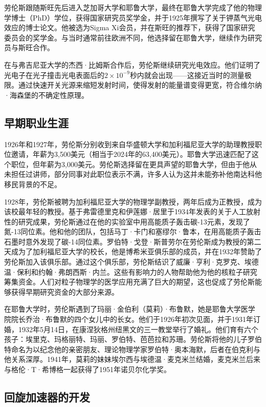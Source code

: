 劳伦斯跟随斯旺先后进入芝加哥大学和耶鲁大学，最终在耶鲁大学完成了他的物理学博士（PhD）学位，获得国家研究员奖学金，并于1925年撰写了关于钾蒸气光电效应的博士论文。他被选为Sigma Xi会员，并在斯旺的推荐下，获得了国家研究委员会的奖学金。与当时通常前往欧洲不同，他选择留在耶鲁大学，继续作为研究员与斯旺合作。

在与弗吉尼亚大学的杰西·比姆斯合作后，劳伦斯继续研究光电效应。他们证明了光电子在光子撞击光电表面后的$2 \times10^{-9}$秒内就会出现——这接近当时的测量极限。通过快速开关光源来缩短发射时间，使得发射的能量谱变得更宽，符合维尔纳·海森堡的不确定性原理。
\subsection{早期职业生涯}
1926年和1927年，劳伦斯分别收到来自华盛顿大学和加利福尼亚大学的助理教授职位邀请，年薪为3,500美元（相当于2024年的63,400美元）。耶鲁大学迅速匹配了这个职位，但年薪为3,000美元。劳伦斯选择留在更具声望的耶鲁大学，但由于他从未担任过讲师，部分同事对此职位表示不满，许多人认为这并未能弥补他南达科他移民背景的不足。

1928年，劳伦斯被聘为加利福尼亚大学的物理学副教授，两年后成为正教授，成为该校最年轻的教授。基于弗雷德里克和伊莲娜·居里于1934年发表的关于人工放射性的研究成果，劳伦斯通过在他的实验室中用高能质子轰击碳-13元素，发现了氮-13同位素。他和他的团队，包括马丁·卡门和塞缪尔·鲁本，在用高能质子轰击石墨时意外发现了碳-14同位素。罗伯特·戈登·斯普劳尔在劳伦斯成为教授的第二天成为了加利福尼亚大学的校长，他是博希米亚俱乐部的成员，并在1932年赞助了劳伦斯加入该俱乐部。通过这个俱乐部，劳伦斯结识了威廉·亨利·克罗克、埃德温·保利和约翰·弗朗西斯·内兰。这些有影响力的人物帮助他为他的核粒子研究筹集资金。人们对粒子物理学的医学应用充满了巨大的期望，这也促成了劳伦斯能够获得早期研究资金的大部分来源。

在耶鲁大学时，劳伦斯遇到了玛丽·金伯利（莫莉）·布鲁默，她是耶鲁大学医学院院长乔治·布鲁默的四个女儿中的长女。他们于1926年初次见面，并于1931年订婚，1932年5月14日，在康涅狄格州纽黑文的三一教堂举行了婚礼。他们育有六个孩子：埃里克、玛格丽特、玛丽、罗伯特、芭芭拉和苏珊。劳伦斯将他的儿子罗伯特命名为以纪念他的亲密朋友、理论物理学家罗伯特·奥本海默，后者在伯克利与他关系深厚。1941年，莫莉的妹妹埃尔西与埃德温·麦克米兰结婚，麦克米兰后来与格伦·T·希博格一起获得了1951年诺贝尔化学奖。
\subsection{回旋加速器的开发}
